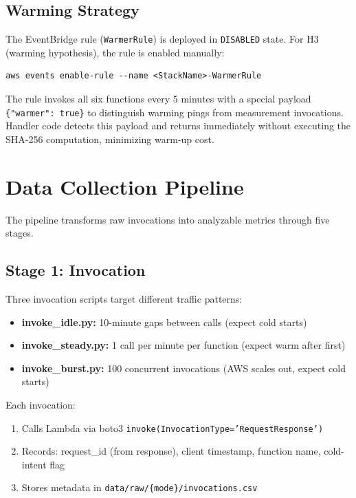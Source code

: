 \subsection{Warming Strategy}

The EventBridge rule (\texttt{WarmerRule}) is deployed in \texttt{DISABLED} state. For H3 (warming hypothesis), the rule is enabled manually:

\begin{verbatim}
aws events enable-rule --name <StackName>-WarmerRule
\end{verbatim}

The rule invokes all six functions every 5 minutes with a special payload \texttt{\{"warmer": true\}} to distinguish warming pings from measurement invocations. Handler code detects this payload and returns immediately without executing the SHA-256 computation, minimizing warm-up cost.

\section{Data Collection Pipeline}

The pipeline transforms raw invocations into analyzable metrics through five stages.

\subsection{Stage 1: Invocation}

Three invocation scripts target different traffic patterns:

\begin{itemize}
    \item \textbf{invoke\_idle.py:} 10-minute gaps between calls (expect cold starts)
    \item \textbf{invoke\_steady.py:} 1 call per minute per function (expect warm after first)
    \item \textbf{invoke\_burst.py:} 100 concurrent invocations (AWS scales out, expect cold starts)
\end{itemize}

Each invocation:
\begin{enumerate}
    \item Calls Lambda via boto3 \texttt{invoke(InvocationType='RequestResponse')}
    \item Records: request\_id (from response), client timestamp, function name, cold-intent flag
    \item Stores metadata in \texttt{data/raw/\{mode\}/invocations.csv}
\end{enumerate}

